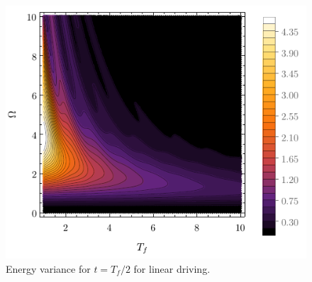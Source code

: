 \begin{figure}[H]
    \centering
    \includegraphics[scale=1.2]{../img/contVariance.pdf}
    \caption{Energy variance for $t=T_f/2$ for linear driving.}
    \label{fig:densVarLin}
\end{figure}

















